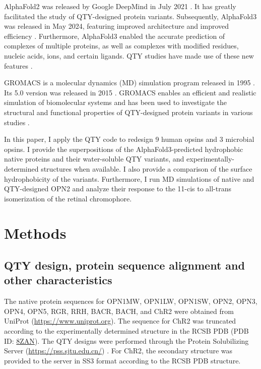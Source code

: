 \documentclass[fleqn, 10pt]{manuscript}
\begin{document}
AlphaFold2 was released by Google DeepMind in July 2021 \citep{Jumper_2021}. It has greatly facilitated the study of QTY-designed protein variants. Subsequently, AlphaFold3 was released in May 2024, featuring improved architecture and improved efficiency \citep{Abramson_2024}. Furthermore, AlphaFold3 enabled the accurate prediction of complexes of multiple proteins, as well as complexes with modified residues, nucleic acids, ions, and certain ligands. QTY studies have made use of these new features \citep{Chen_2025, Johnsson_2025}. 

GROMACS is a molecular dynamics (MD) simulation program released in 1995 \citep{Berendsen_1995}. Its 5.0 version was released in 2015 \citep{Abraham_2015}. GROMACS enables an efficient and realistic simulation of biomolecular systems and has been used to investigate the structural and functional properties of QTY-designed protein variants in various studies \citep{Karagol_2024, Li_Tang_2024, Smorodina_2024, Li_Wang_2024, Johnsson_2025}. 

In this paper, I apply the QTY code to redesign 9 human opsins and 3 microbial opsins. I provide the superpositions of the AlphaFold3-predicted hydrophobic native proteins and their water-soluble QTY variants, and experimentally-determined structures when available. I also provide a comparison of the surface hydrophobicity of the variants. Furthermore, I run MD simulations of native and QTY-designed OPN2 and analyze their response to the 11-cis to all-trans isomerization of the retinal chromophore. 

\section*{Methods}

\subsection*{QTY design, protein sequence alignment and other characteristics}

The native protein sequences for OPN1MW, OPN1LW, OPN1SW, OPN2, OPN3, OPN4, OPN5, RGR, RRH, BACR, BACH, and ChR2 were obtained from UniProt (\url{https://www.uniprot.org}). The sequence for ChR2 was truncated according to the experimentally determined structure in the RCSB PDB (PDB ID: \href{https://www.rcsb.org/structure/8ZAN}{8ZAN}). The QTY designs were performed through the Protein Solubilizing Server (\url{https://pss.sjtu.edu.cn/}) \citep{Tao_2022}. For ChR2, the secondary structure was provided to the server in SS3 format according to the RCSB PDB structure. 
\end{document}
